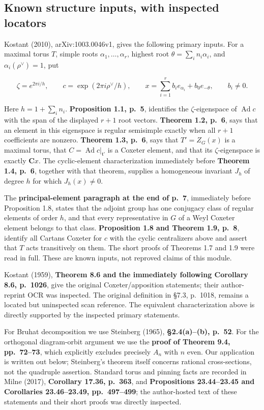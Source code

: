 \documentclass[11pt,a4paper]{article}
\theoremstyle{definition}\newtheorem{definition}[theorem]{Definition}
\theoremstyle{remark}\newtheorem{remark}[theorem]{Remark}
\begin{document}
\subsection{Known structure inputs, with inspected
locators}\label{known-structure-inputs-with-inspected-locators}

Kostant (2010), arXiv:1003.0046v1, gives the following primary inputs.
For a maximal torus \(T\), simple roots \(\alpha_1,\ldots,\alpha_r\),
highest root \(\theta=\sum_i n_i\alpha_i\), and
\(\alpha_i(\rho^\vee)=1\), put

\[
 \zeta=e^{2\pi i/h},\qquad
 c=\exp(2\pi i\rho^\vee/h),\qquad
 x=\sum_{i=1}^r b_i e_{\alpha_i}+b_0e_{-\theta},
 \qquad b_i\ne0.
 \tag{CC-APG.1}
\]

Here \(h=1+\sum_i n_i\). \textbf{Proposition 1.1, p.~5}, identifies the
\(\zeta\)-eigenspace of \(\operatorname{Ad}c\) with the span of the
displayed \(r+1\) root vectors. \textbf{Theorem 1.2, p.~6}, says that an
element in this eigenspace is regular semisimple exactly when all
\(r+1\) coefficients are nonzero. \textbf{Theorem 1.3, p.~6}, says that
\(T'=Z_G(x)\) is a maximal torus, that
\(C=\operatorname{Ad}c|_{\mathfrak t'}\) is a Coxeter element, and that
its \(\zeta\)-eigenspace is exactly \(\mathbf Cx\). The cyclic-element
characterization immediately before \textbf{Theorem 1.4, p.~6}, together
with that theorem, supplies a homogeneous invariant \(J_h\) of degree
\(h\) for which \(J_h(x)\ne0\).

The \textbf{principal-element paragraph at the end of p.~7}, immediately
before Proposition 1.8, states that the adjoint group has one conjugacy
class of regular elements of order \(h\), and that every representative
in \(G\) of a Weyl Coxeter element belongs to that class.
\textbf{Proposition 1.8 and Theorem 1.9, p.~8}, identify all Cartans
Coxeter for \(c\) with the cyclic centralizers above and assert that
\(T\) acts transitively on them. The short proofs of Theorems 1.7 and
1.9 were read in full. These are known inputs, not reproved claims of
this module.

Kostant (1959), \textbf{Theorem 8.6 and the immediately following
Corollary 8.6, p.~1026}, give the original Coxeter/apposition
statements; their author-reprint OCR was inspected. The original
definition in §7.3, p.~1018, remains a located but uninspected scan
reference. The equivalent characterization above is directly supported
by the inspected primary statements.

For Bruhat decomposition we use Steinberg (1965), \textbf{§2.4(a)--(b),
p.~52}. For the orthogonal diagram-orbit argument we use the
\textbf{proof of Theorem 9.4, pp.~72--73}, which explicitly excludes
precisely \(A_n\) with \(n\) even. Our application is written out below;
Steinberg's theorem itself concerns rational cross-sections, not the
quadruple assertion. Standard torus and pinning facts are recorded in
Milne (2017), \textbf{Corollary 17.36, p.~363}, and \textbf{Propositions
23.44--23.45 and Corollaries 23.46--23.49, pp.~497--499}; the
author-hosted text of these statements and their short proofs was
directly inspected.
\end{document}
